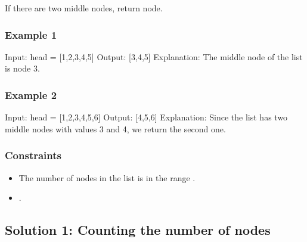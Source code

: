 \documentclass[letterpaper,12pt,english]{book}
\begin{document}
\sphinxAtStartPar
If there are two middle nodes, return  node.


\subsubsection{Example 1}
\label{\detokenize{Two_Pointers/08_TP_876_Middle_of_the_Linked_List:example-1}}
\sphinxAtStartPar
{}

\begin{sphinxVerbatim}[commandchars=\\\{\}]
Input: head = [1,2,3,4,5]
Output: [3,4,5]
Explanation: The middle node of the list is node 3.
\end{sphinxVerbatim}


\subsubsection{Example 2}
\label{\detokenize{Two_Pointers/08_TP_876_Middle_of_the_Linked_List:example-2}}
\sphinxAtStartPar
{}

\begin{sphinxVerbatim}[commandchars=\\\{\}]
Input: head = [1,2,3,4,5,6]
Output: [4,5,6]
Explanation: Since the list has two middle nodes with values 3 and 4, we return the second one.
\end{sphinxVerbatim}


\subsubsection{Constraints}
\label{\detokenize{Two_Pointers/08_TP_876_Middle_of_the_Linked_List:constraints}}\begin{itemize}
\item {} 
\sphinxAtStartPar
The number of nodes in the list is in the range \sphinxcode{\sphinxupquote{{[}1, 100{]}}}.

\item {} 
\sphinxAtStartPar
{}.

\end{itemize}


\subsection{Solution 1: Counting the number of nodes}
\label{\detokenize{Two_Pointers/08_TP_876_Middle_of_the_Linked_List:solution-1-counting-the-number-of-nodes}}
\end{document}
